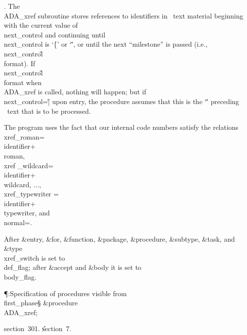 . The \\{ADA\_xref} subroutine stores references to identifiers in
\ADA\ text material beginning with the current value of \\{next\_control}
and continuing until \\{next\_control} is `\.\{' or `\v', or until the next
``milestone'' is passed (i.e., \\{next\_control}\?\G\?\\{format}). If
\\{next\_control}\?\G\?\\{format} when \\{ADA\_xref} is called, nothing will
happen;
but if \\{next\_control}\?=\?\H{|} upon entry, the procedure assumes that this
is
the `\v' preceding \ADA\ text that is to be processed.

The program uses the fact that our internal code numbers satisfy
the relations \\{xref\_roman}\?=\?\\{identifier}\?+\?\\{roman}, \\{xref%
\_wildcard}\?=\?\\{identifier}\?+\?\\{wildcard}, $\ldots$, \\{xref\_typewriter}%
\?=\?\\{identifier}\?+\?\\{typewriter},
and \\{normal}\?=.

After \&{entry}, \&{for}, \&{function}, \&{package}, \&{procedure},
\&{subtype}, \&{task}, and \&{type} \\{xref\_switch} is set to \\{def\_flag};
after \&{accept} and \&{body} it is set to \\{body\_flag}.

\Y\P\?\4:Specification of procedures visible from \\{first\_phase}\X\S\?\6
\&{procedure}\8\1\\{ADA\_xref}\2;\par
\A section~301.
\U section~7\*.\fi

